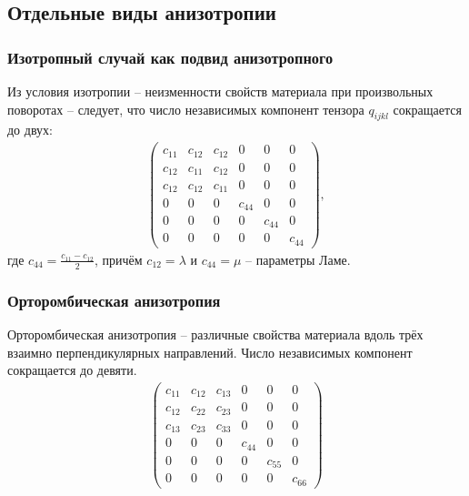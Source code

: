 \subsection{Отдельные виды анизотропии}
\subsubsection{Изотропный случай как подвид анизотропного}
Из условия изотропии -- неизменности свойств материала при произвольных поворотах -- следует, что число независимых компонент тензора $q_{ijkl}$ сокращается до двух:
\begin{align}
\left( \begin{array}{cccccccccccc}
c_{11} & c_{12} & c_{12} & 0 & 0 & 0 \\ 
c_{12} & c_{11} & c_{12} & 0 & 0 & 0 \\ 
c_{12} & c_{12} & c_{11} & 0 & 0 & 0 \\ 
0 & 0 & 0 & c_{44} & 0 & 0 \\ 
0 & 0 & 0 & 0 & c_{44} & 0 \\ 
0 & 0 & 0 & 0 & 0 & c_{44}
\end{array} \right){},
\end{align}
где $ c_{44} = \frac{c_{11} - c_{12}}{2} $, причём $c_{12} = \lambda$ и $c_{44} = \mu$ -- параметры Ламе.

\subsubsection{Орторомбическая анизотропия}
Орторомбическая анизотропия -- различные свойства материала вдоль трёх взаимно перпендикулярных направлений. Число независимых компонент сокращается до девяти.
\begin{align}
\label{orthorombic_tensor}
\left( \begin{array}{cccccccccccc}
c_{11} & c_{12} & c_{13} & 0 & 0 & 0 \\ 
c_{12} & c_{22} & c_{23} & 0 & 0 & 0 \\ 
c_{13} & c_{23} & c_{33} & 0 & 0 & 0 \\ 
0 & 0 & 0 & c_{44} & 0 & 0 \\ 
0 & 0 & 0 & 0 & c_{55} & 0 \\ 
0 & 0 & 0 & 0 & 0 & c_{66}
\end{array} \right){}
\end{align}

